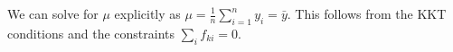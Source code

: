 We can solve for $\mu$ explicitly as  
$\mu = \frac{1}{n} \sum_{i=1}^n y_i = \bar{y}$.  This follows from the
KKT conditions
and the constraints $\sum_i f_{ki} = 0$.



